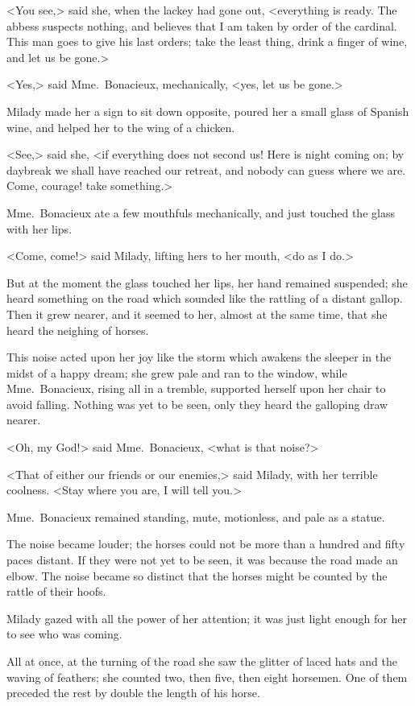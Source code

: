 <You see,> said she, when the lackey had gone out, <everything is ready. The abbess suspects nothing, and believes that I am taken by order of the cardinal. This man goes to give his last orders; take the least thing, drink a finger of wine, and let us be gone.> 

<Yes,> said Mme.~Bonacieux, mechanically, <yes, let us be gone.> 

Milady made her a sign to sit down opposite, poured her a small glass of Spanish wine, and helped her to the wing of a chicken. 

<See,> said she, <if everything does not second us! Here is night coming on; by daybreak we shall have reached our retreat, and nobody can guess where we are. Come, courage! take something.> 

Mme.~Bonacieux ate a few mouthfuls mechanically, and just touched the glass with her lips. 

<Come, come!> said Milady, lifting hers to her mouth, <do as I do.> 

But at the moment the glass touched her lips, her hand remained suspended; she heard something on the road which sounded like the rattling of a distant gallop. Then it grew nearer, and it seemed to her, almost at the same time, that she heard the neighing of horses. 

This noise acted upon her joy like the storm which awakens the sleeper in the midst of a happy dream; she grew pale and ran to the window, while Mme.~Bonacieux, rising all in a tremble, supported herself upon her chair to avoid falling. Nothing was yet to be seen, only they heard the galloping draw nearer. 

<Oh, my God!> said Mme.~Bonacieux, <what is that noise?> 

<That of either our friends or our enemies,> said Milady, with her terrible coolness. <Stay where you are, I will tell you.> 

Mme.~Bonacieux remained standing, mute, motionless, and pale as a statue. 

The noise became louder; the horses could not be more than a hundred and fifty paces distant. If they were not yet to be seen, it was because the road made an elbow. The noise became so distinct that the horses might be counted by the rattle of their hoofs. 

Milady gazed with all the power of her attention; it was just light enough for her to see who was coming. 

All at once, at the turning of the road she saw the glitter of laced hats and the waving of feathers; she counted two, then five, then eight horsemen. One of them preceded the rest by double the length of his horse. 

